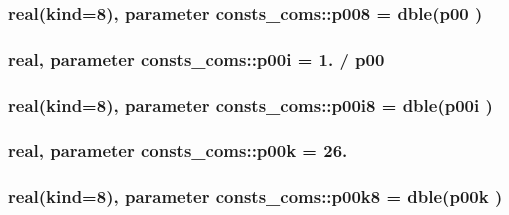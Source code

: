 \subsubsection[{\texorpdfstring{p008}{p008}}]{\setlength{\rightskip}{0pt plus 5cm}real(kind=8), parameter consts\+\_\+coms\+::p008 = dble({\bf p00} )}\hypertarget{namespaceconsts__coms_a9b5c692d7673876383486b7799a59d94}{}\label{namespaceconsts__coms_a9b5c692d7673876383486b7799a59d94}
\subsubsection[{\texorpdfstring{p00i}{p00i}}]{\setlength{\rightskip}{0pt plus 5cm}real, parameter consts\+\_\+coms\+::p00i = 1. / {\bf p00}}\hypertarget{namespaceconsts__coms_aeaba287fa2285b85b6739b70bb76f165}{}\label{namespaceconsts__coms_aeaba287fa2285b85b6739b70bb76f165}
\subsubsection[{\texorpdfstring{p00i8}{p00i8}}]{\setlength{\rightskip}{0pt plus 5cm}real(kind=8), parameter consts\+\_\+coms\+::p00i8 = dble({\bf p00i} )}\hypertarget{namespaceconsts__coms_aced376c2b60cbe3cc01a37de719e2eef}{}\label{namespaceconsts__coms_aced376c2b60cbe3cc01a37de719e2eef}
\subsubsection[{\texorpdfstring{p00k}{p00k}}]{\setlength{\rightskip}{0pt plus 5cm}real, parameter consts\+\_\+coms\+::p00k = 26.}\hypertarget{namespaceconsts__coms_ac33b326d1376f1dc4b743c9b7fef5cac}{}\label{namespaceconsts__coms_ac33b326d1376f1dc4b743c9b7fef5cac}
\subsubsection[{\texorpdfstring{p00k8}{p00k8}}]{\setlength{\rightskip}{0pt plus 5cm}real(kind=8), parameter consts\+\_\+coms\+::p00k8 = dble({\bf p00k} )}\hypertarget{namespaceconsts__coms_ab098055e26cfe6181b0ca724380c5b30}{}\label{namespaceconsts__coms_ab098055e26cfe6181b0ca724380c5b30}
